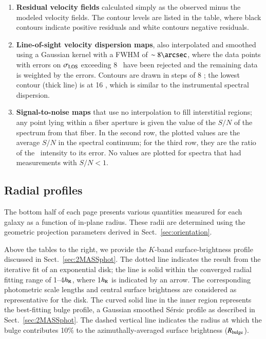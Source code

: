 \documentclass[traditabstract]{aa} %
\begin{document}
\begin{enumerate}
from axisymmetry occur mainly at the edges of the field-of-view for the stellar
data and, for the same reason, near the galaxy centers for the \oiii\ velocity
fields.  The isovelocity contour levels are the same for the model and observed
velocity fields.
%
\item {\bf Residual velocity fields} calculated simply as the observed minus the
modeled velocity fields. The contour levels are listed in the table, where black
contours indicate positive residuals and white contours negative residuals.
%
\item {\bf Line-of-sight velocity dispersion maps}, also interpolated and
smoothed using a Gaussian kernel with a FWHM of $\sim8\arcsec$, where the data
points with errors on $\sigma_{\rm LOS}$ exceeding 8 \kms\ have been rejected and the
remaining data is weighted by the errors. Contours are drawn in steps of 8 \kms;
the lowest contour (thick line) is at 16 \kms, which is similar to the
instrumental spectral dispersion.
%
\item {\bf Signal-to-noise maps} that use no interpolation to fill interstitial
regions; any point lying within a fiber aperture is given the value of the $S/N$
of the spectrum from that fiber.  In the second row, the plotted values are the
average $S/N$ in the spectral continuum; for the third row, they are the ratio
of the \oiii\ intensity to its error. No values are plotted for spectra that had
measurements with $S/N < 1$.
%
\end{enumerate}

\subsection{Radial profiles}

The bottom half of each page presents various quantities measured for each
galaxy as a function of in-plane radius.  These radii are determined using the
geometric projection parameters derived in Sect.~\ref{sec:orientation}.

Above the tables to the right, we provide the $K$-band surface-brightness
profile discussed in Sect.~\ref{sec:2MASSphot}.  The dotted line indicates the
result from the iterative fit of an exponential disk; the line is solid within
the converged radial fitting range of 1--4$h_{\rm R}$, where 1$h_{\rm R}$ is indicated by an
arrow.  The corresponding photometric scale lengths and central surface
brightness are considered as representative for the disk.  The curved solid line
in the inner region represents the best-fitting bulge profile, a Gaussian
smoothed S{\'e}rsic profile as described in Sect.~\ref{sec:2MASSphot}.  The
dashed vertical line indicates the radius at which the bulge contributes 10\% to
the azimuthally-averaged surface brightness ($R_{\rm bulge}$).
\end{document}
